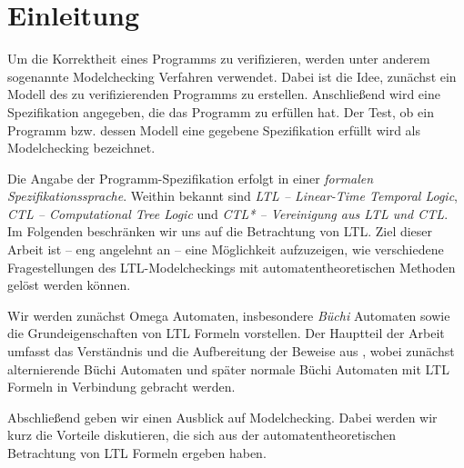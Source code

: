 \section{Einleitung}

Um die Korrektheit eines Programms zu verifizieren, werden unter anderem sogenannte Modelchecking Verfahren verwendet. Dabei ist die Idee, zunächst ein Modell des zu verifizierenden Programms zu erstellen. Anschließend wird eine Spezifikation angegeben, die das Programm zu erfüllen hat. Der Test, ob ein Programm bzw. dessen Modell eine gegebene Spezifikation erfüllt wird als Modelchecking bezeichnet.

Die Angabe der Programm-Spezifikation erfolgt in einer \textit{formalen Spezifikationssprache}. Weithin bekannt sind \textit{LTL -- Linear-Time Temporal Logic}, \textit{CTL -- Computational Tree Logic} und \textit{CTL* -- Vereinigung aus LTL und CTL}. Im Folgenden beschränken wir uns auf die Betrachtung von LTL. Ziel dieser Arbeit ist -- eng angelehnt an \cite{vardi+96} -- eine Möglichkeit aufzuzeigen, wie verschiedene Fragestellungen des LTL-Modelcheckings mit automatentheoretischen Methoden gelöst werden können. 

Wir werden zunächst Omega Automaten, insbesondere \textit{Büchi} Automaten sowie die Grundeigenschaften von LTL Formeln vorstellen. Der Hauptteil der Arbeit umfasst das Verständnis und die Aufbereitung der Beweise aus \cite{vardi+96}, wobei zunächst alternierende Büchi Automaten und später normale Büchi Automaten mit LTL Formeln in Verbindung gebracht werden.

Abschließend geben wir einen Ausblick auf Modelchecking. Dabei werden wir kurz die Vorteile diskutieren, die sich aus der automatentheoretischen Betrachtung von LTL Formeln ergeben haben.